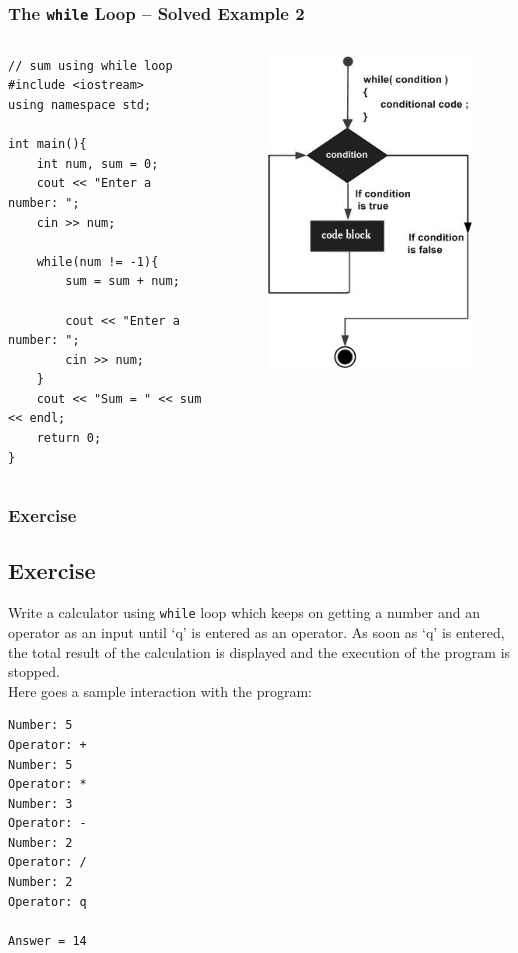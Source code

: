 \documentclass{beamer}
\begin{document}
\begin{frame} [fragile]
    \frametitle{The \texttt{while} Loop -- Solved Example 2}
    \begin{columns}
        \lstset{style=mystyle}
\begin{lstlisting}
// sum using while loop
#include <iostream>
using namespace std;

int main(){
    int num, sum = 0;
    cout << "Enter a number: ";
    cin >> num;

    while(num != -1){
        sum = sum + num;

        cout << "Enter a number: ";
        cin >> num;
    }
    cout << "Sum = " << sum << endl;
    return 0;
}
\end{lstlisting}
            \begin{figure}
                \centering
                \includegraphics[scale=0.4]{while}
            \end{figure}
    \end{columns}
\end{frame}

\begin{frame} [fragile]
    \frametitle{Exercise}
    \subsection{Exercise} %
    \label{subsec:while_exercise}
    Write a calculator using \texttt{while} loop which keeps on getting a number and an operator as an input until `q' is entered as an operator. As soon as `q' is entered, the total result of the calculation is displayed and the execution of the program is stopped. \\ [0.2 in]
    Here goes a sample interaction with the program: \\
    \lstset{style=mystyle}
\begin{lstlisting}
Number: 5
Operator: +
Number: 5
Operator: *
Number: 3
Operator: -
Number: 2
Operator: /
Number: 2
Operator: q

Answer = 14
\end{lstlisting}
\end{frame}
\end{document}
